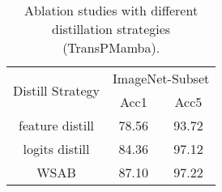 


\begin{table}[]
\centering
\scalebox{1.0}
{
\begin{tabular}{c|cc}
\midrule
\multirow{2}{*}{Distill Strategy} & \multicolumn{2}{c}{ImageNet-Subset} \\
                       & \multicolumn{1}{c|}{Acc1}   & Acc5  \\ \midrule
feature distill          &   78.56   &    93.72       \\
logits distill           &  84.36    &  97.12         \\
WSAB &   87.10    &  97.22        \\ \midrule
\end{tabular}}
\caption{
Ablation studies with different distillation strategies (TransPMamba).
}
\label{tab:aba_distill}
\end{table}